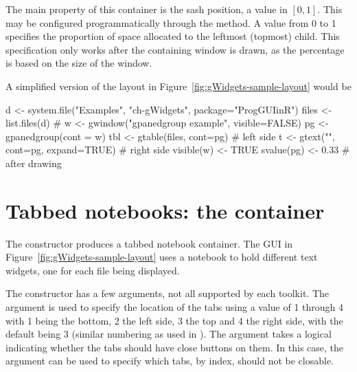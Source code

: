 The main property of this container is the sash position, a value in
$[0,1]$. This may be configured programmatically through the
 method. A value from 0 to 1
specifies the proportion of space allocated to the leftmost (topmost)
child. This specification only works after the containing window is
drawn, as the percentage is based on the size of the window.


A simplified version of the layout in
Figure~\ref{fig:gWidgets-sample-layout} would be
\begin{Schunk}
\begin{Sinput}
 d <- system.file("Examples", "ch-gWidgets", 
                  package="ProgGUIinR")
 files <- list.files(d)
 #
 w <- gwindow("gpanedgroup example", visible=FALSE)
 pg <- gpanedgroup(cont = w)
 tbl <- gtable(files, cont=pg)           # left side
 t <- gtext("", cont=pg, expand=TRUE)    # right side
 visible(w) <- TRUE
 svalue(pg) <- 0.33                      # after drawing
\end{Sinput}
\end{Schunk}




  
\section{Tabbed notebooks: the  container}
\label{sec:gWidgets-gnotebook}

The  constructor produces a tabbed notebook
container. The GUI in Figure~\ref{fig:gWidgets-sample-layout} uses a
notebook to hold different text widgets, one for each file being displayed.

The constructor has a few arguments, not all supported by each
toolkit. The argument  is used to specify
the location of the tabs using a value of 1 through 4 with 1 being
the bottom, 2 the left side, 3 the top and 4 the right side, with the
default being 3 (similar numbering as used in ). The
 argument takes a logical indicating
whether the tabs should have close buttons on them. In this case, the
argument  can be used to specify
which tabs, by index, should not be closable.



